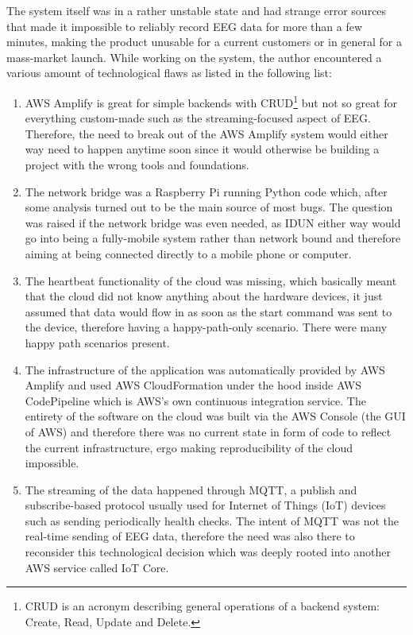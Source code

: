 The system itself was in a rather unstable state and had strange error sources that made it impossible to reliably record EEG data for more than a few minutes, making the product unusable for a current customers or in general for a mass-market launch. While working on the system, the author encountered a various amount of technological flaws as listed in the following list:

\begin{enumerate}
  \item AWS Amplify is great for simple backends with CRUD\footnote{CRUD is an acronym describing general operations of a backend system: Create, Read, Update and Delete.} but not so great for everything custom-made such as the streaming-focused aspect of EEG. Therefore, the need to break out of the AWS Amplify system would either way need to happen anytime soon since it would otherwise be building a project with the wrong tools and foundations.
  \item The network bridge was a Raspberry Pi running Python code which, after some analysis turned out to be the main source of most bugs. The question was raised if the network bridge was even needed, as IDUN either way would go into being a fully-mobile system rather than network bound and therefore aiming at being connected directly to a mobile phone or computer.
  \item The heartbeat functionality of the cloud was missing, which basically meant that the cloud did not know anything about the hardware devices, it just assumed that data would flow in as soon as the start command was sent to the device, therefore having a happy-path-only scenario. There were many happy path scenarios present.
   \item The infrastructure of the application was automatically provided by AWS Amplify and used AWS CloudFormation under the hood inside AWS CodePipeline which is AWS's own continuous integration service. The entirety of the software on the cloud was built via the AWS Console (the GUI of AWS) and therefore there was no current state in form of code to reflect the current infrastructure, ergo making reproducibility of the cloud impossible.
   \item The streaming of the data happened through MQTT, a publish and subscribe-based protocol usually used for Internet of Things (IoT) devices such as sending periodically health checks. The intent of MQTT was not the real-time sending of EEG data, therefore the need was also there to reconsider this technological decision which was deeply rooted into another AWS service called IoT Core.

\end{enumerate}
